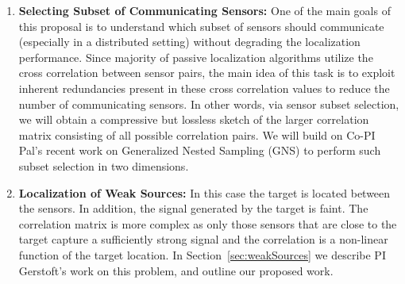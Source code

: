 \begin{enumerate}
\item {\bf Selecting Subset of Communicating Sensors:} One of the main goals of this proposal is to understand which subset of sensors should communicate (especially in a distributed setting) without degrading the localization performance. Since majority of passive localization algorithms utilize the cross correlation between sensor pairs, the main idea of this task is to exploit inherent redundancies present in these cross correlation values to reduce the number of communicating sensors. In other words, via sensor subset selection, we will obtain a compressive but lossless sketch of the larger correlation matrix consisting of all possible correlation pairs. We will build on Co-PI Pal's recent work on Generalized Nested Sampling (GNS) to perform such subset selection in two dimensions.
\item {\bf Localization of Weak Sources:}  In this case the target is located between the sensors. In addition, the signal generated by the target is faint. The correlation matrix is more complex as only those sensors that are close to the target capture a sufficiently strong signal and the correlation is a non-linear function of the target location. In Section~\ref{sec:weakSources} we describe PI Gerstoft's work on this problem, and outline our proposed work.

\end{enumerate}


